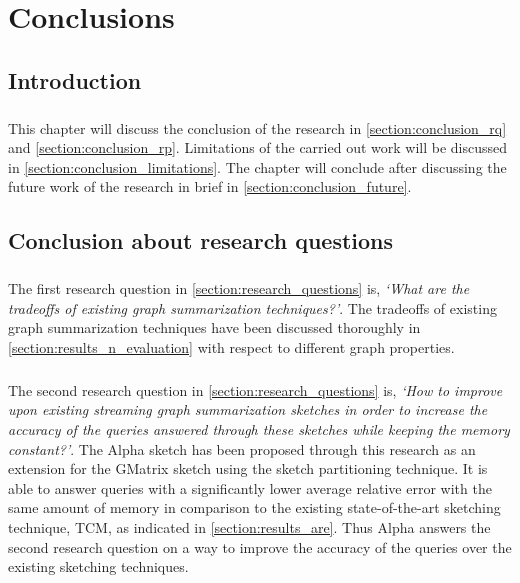 \chapter{Conclusions}

\section{Introduction}

\paragraph{}
This chapter will discuss the conclusion of the research in \autoref{section:conclusion_rq} and \autoref{section:conclusion_rp}. Limitations of the carried out work will be discussed in \autoref{section:conclusion_limitations}. The chapter will conclude after discussing the future work of the research in brief in \autoref{section:conclusion_future}.

\section{Conclusion about research questions}
\label{section:conclusion_rq}

\paragraph{}
The first research question in \autoref{section:research_questions} is, \textit{‘What are the tradeoffs of existing graph summarization techniques?’}. The tradeoffs of existing graph summarization techniques have been discussed thoroughly in \autoref{section:results_n_evaluation} with respect to different graph properties.

\paragraph{}
The second research question in \autoref{section:research_questions} is, \textit{‘How to improve upon existing streaming graph summarization sketches in order to increase the accuracy of the queries answered through these sketches while keeping the memory constant?’}. The Alpha sketch has been proposed through this research as an extension for the GMatrix sketch using the sketch partitioning technique. It is able to answer queries with a significantly lower average relative error with the same amount of memory in comparison to the existing state-of-the-art sketching technique, TCM, as indicated in \autoref{section:results_are}. Thus Alpha answers the second research question on a way to improve the accuracy of the queries over the existing sketching techniques.

